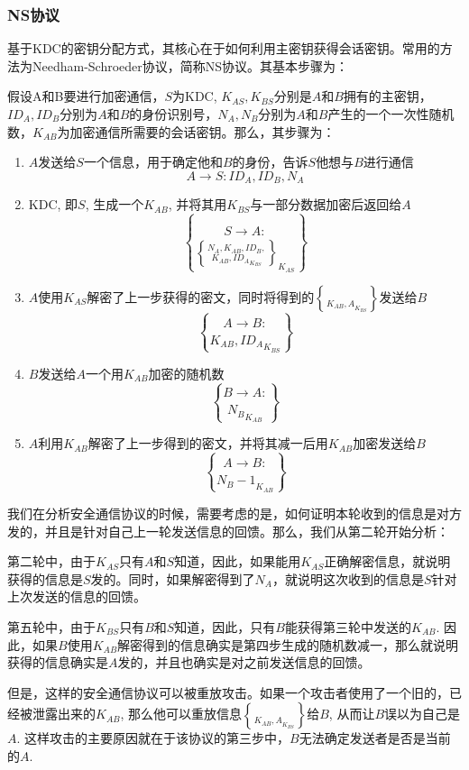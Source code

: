 \subsubsection{NS协议}
基于KDC的密钥分配方式，其核心在于如何利用主密钥获得会话密钥。常用的方法为Needham-Schroeder协议，简称NS协议。其基本步骤为：\par
假设A和B要进行加密通信，$S$为KDC, $K_{AS}, K_{BS}$分别是$A$和$B$拥有的主密钥，$ID_A, ID_B$分别为$A$和$B$的身份识别号，$N_A, N_B$分别为$A$和$B$产生的一个一次性随机数，$K_{AB}$为加密通信所需要的会话密钥。那么，其步骤为：
\begin{enumerate}
	\item $A$发送给$S$一个信息，用于确定他和$B$的身份，告诉$S$他想与$B$进行通信
	\[A\to S: ID_A, ID_B, N_A\]
	\item KDC, 即$S$, 生成一个$K_{AB}$, 并将其用$K_{BS}$与一部分数据加密后返回给$A$
	\[S\to A: \brace{N_A, K_{AB}, ID_B, \brace{K_{AB}, ID_A}_{K_{BS}}}_{K_{AS}}\]
	\item $A$使用$K_{AS}$解密了上一步获得的密文，同时将得到的$\brace{K_{AB}, A}_{K_{BS}}$发送给$B$
	\[A\to B: \brace{K_{AB}, ID_A}_{K_{BS}}\]
	\item $B$发送给$A$一个用$K_{AB}$加密的随机数
	\[B\to A: \brace{N_B}_{K_{AB}}\]
	\item $A$利用$K_{AB}$解密了上一步得到的密文，并将其减一后用$K_{AB}$加密发送给$B$
	\[A\to B: \brace{N_B - 1}_{K_{AB}}\]
\end{enumerate}

我们在分析安全通信协议的时候，需要考虑的是，如何证明本轮收到的信息是对方发的，并且是针对自己上一轮发送信息的回馈。那么，我们从第二轮开始分析：\par
第二轮中，由于$K_{AS}$只有$A$和$S$知道，因此，如果能用$K_{AS}$正确解密信息，就说明获得的信息是$S$发的。同时，如果解密得到了$N_A$，就说明这次收到的信息是$S$针对上次发送的信息的回馈。\par
第五轮中，由于$K_{BS}$只有$B$和$S$知道，因此，只有$B$能获得第三轮中发送的$K_{AB}$. 因此，如果$B$使用$K_{AB}$解密得到的信息确实是第四步生成的随机数减一，那么就说明获得的信息确实是$A$发的，并且也确实是对之前发送信息的回馈。\par
但是，这样的安全通信协议可以被重放攻击。如果一个攻击者使用了一个旧的，已经被泄露出来的$K_{AB}$, 那么他可以重放信息$\brace{K_{AB}, A}_{K_{BS}}$给$B$, 从而让$B$误以为自己是$A$. 这样攻击的主要原因就在于该协议的第三步中，$B$无法确定发送者是否是当前的$A$.